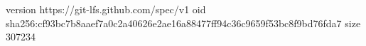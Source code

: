 version https://git-lfs.github.com/spec/v1
oid sha256:cf93bc7b8aaef7a0c2a40626e2ae16a88477ff94c36c9659f53bc8f9bd76fda7
size 307234
